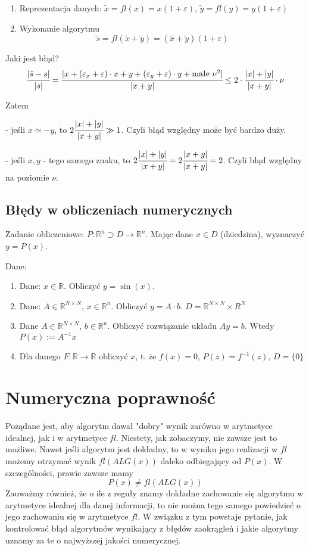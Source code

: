 \documentclass[hidelinks,a4paper,fleqn,oneside]{book}
\newcommand{\RR}{\mathbb{R}}
\newcommand{\ra}{\rightarrow}
\begin{document}
\begin{enumerate}
	\item Reprezentacja danych: $\tilde{x} = fl(x) = x(1+\varepsilon)$,
	      $\tilde{y} = fl(y) = y(1 + \varepsilon)$
	\item Wykonanie algorytmu
	      \[
	      	\tilde{s} = fl(\tilde{x} + \tilde{y}) = (\tilde{x} + \tilde{y})(1 + \varepsilon)
	      \]
\end{enumerate}

Jaki jest błąd?
\[
	\cfrac{|\tilde{s} - s|}{|s|} = \cfrac{|x + (\varepsilon_x + \varepsilon)\cdot x + y + (\varepsilon_y + \varepsilon)\cdot y + \textrm{małe }\nu^2|}{|x + y|} \leq 2 \cdot \cfrac{|x|+|y|}{|x+y|} \cdot \nu
\]

Zatem

- jeśli $x \simeq -y$, to $2\cfrac{|x|+|y|}{|x+y|} \gg 1$. Czyli błąd względny może być bardzo duży.

- jeśli $x, y$ - tego samego znaku, to $2 \cfrac{|x|+|y|}{|x+y|} = 2 \cfrac{|x+y|}{|x+y|} = 2$. Czyli błąd względny na poziomie $\nu$.

\subsection{Błędy w obliczeniach numerycznych}

Zadanie obliczeniowe: $P: \RR^n \supset D \ra \RR^n$. Mając dane $x \in D$ (dziedzina), wyznaczyć $y = P(x)$.

Dane:

\begin{enumerate}
	\item Dane: $x \in \RR$. Obliczyć $y=\sin(x)$.
	\item Dane: $A \in \RR^{N \times N}$, $x \in \RR^n$. Obliczyć $y = A \cdot b$.
	      $D = \RR^{N \times N} \times R^N$
	\item Dane $A \in \RR^{N \times N}$, $b \in \RR^n$. Obliczyć rozwiązanie układu $Ay = b$. Wtedy $P(x) := A^{-1}x$
	\item Dla danego $F: \RR \ra \RR$ obliczyć $x$, t. że $f(x) = 0$,
	      $P(z) = f^{-1}(z)$, $D = \{0\}$
\end{enumerate}


\section{Numeryczna poprawność}

Pożądane jest, aby algorytm dawał "dobry" wynik zarówno w arytmetyce idealnej, jak i w arytmetyce $fl$. Niestety, jak zobaczymy, nie zawsze jest to możliwe. Nawet jeśli algorytm jest dokładny, to w wyniku jego realizacji w $fl$ możemy otrzymać wynik $fl(ALG(x))$ daleko odbiegający od $P(x)$. W szczególności, prawie zawsze mamy
\[P(x) \neq fl(ALG(x))\]
Zauważmy również, że o ile z reguły znamy dokładne zachowanie się algorytmu w arytmetyce idealnej dla danej informacji, to nie można tego samego powiedzieć o jego zachowaniu się w arytmetyce $fl$. W związku z tym powstaje pytanie, jak kontrolować błąd algorytmów wynikający z błędów zaokrągleń i jakie algorytmy uznamy za te o najwyższej jakości numerycznej.
\end{document}
